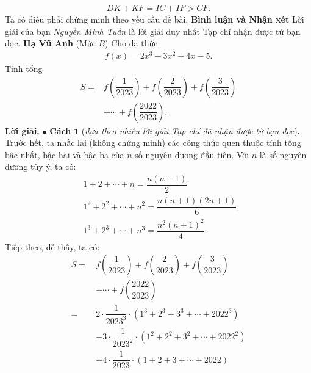 \begin{multicols}{2}
	\begin{align*}
		DK + KF = IC + IF > CF.
	\end{align*}
	Ta có điều phải chứng minh theo yêu cầu đề bài.
	\vskip 0.05cm
	\textbf{\color{thachthuctoanhoc}Bình luận và Nhận xét}
	\vskip 0.05cm
	Lời giải của bạn \textit{Nguyễn Minh Tuấn} là lời giải duy nhất Tạp chí nhận được từ bạn đọc.
	\vskip 0.1cm
	\hfill	\textbf{\color{thachthuctoanhoc}Hạ Vũ Anh}
	\vskip 0.1cm
	{}
	(Mức $B$) Cho đa thức
	\begin{align*}
		f\left( x \right) = 2{x^3} - 3{x^2} + 4x - 5.
	\end{align*}
	Tính tổng
	\begin{align*}
		S =& f\left( {\dfrac{1}{{2023}}} \right) + f\left( {\dfrac{2}{{2023}}} \right) + f\left( {\dfrac{3}{{2023}}} \right) \\
		&+  \cdots  + f\left( {\dfrac{{2022}}{{2023}}} \right).
	\end{align*}
	\textbf{\color{thachthuctoanhoc}Lời giải.}
	\vskip 0.05cm
	$\bullet$ \textbf{\color{thachthuctoanhoc}Cách} $\pmb{1}$ (\textit{dựa theo nhiều lời giải Tạp chí đã nhận được từ bạn đọc})\textbf{\color{thachthuctoanhoc}.}
	\vskip 0.05cm
	Trước hết, ta nhắc lại (không chứng minh) các công thức quen thuộc tính tổng bậc nhất, bậc hai và bậc ba của $n$ số nguyên dương đầu tiên.
	\vskip 0.05cm
	Với $n$ là số nguyên dương tùy ý, ta có:
	\begin{align*}
		&1 + 2 +  \cdots  + n = \dfrac{{n\left( {n + 1} \right)}}{2}\\
		&{1^2} + {2^2} +  \cdots  + {n^2} = \dfrac{{n\left( {n + 1} \right)\left( {2n + 1} \right)}}{6};\\
		&{1^3} + {2^3} +  \cdots  + {n^3} = \dfrac{{{n^2}{{\left( {n + 1} \right)}^2}}}{4}.
	\end{align*}
	Tiếp theo, dễ thấy, ta có:
	\begin{align*}
			S =\, &f\left( {\dfrac{1}{{2023}}} \right) + f\left( {\dfrac{2}{{2023}}} \right) + f\left( {\dfrac{3}{{2023}}} \right) \\
			&+  \cdots  + f\left( {\dfrac{{2022}}{{2023}}} \right)\\
			 =\,\, &2 \cdot \dfrac{1}{{{{2023}^3}}} \cdot \left( {{1^3} + {2^3} + {3^3} +  \cdots  + {{2022}^3}} \right) \\
			 &-\! 3 \!\cdot\! \dfrac{1}{{{{2023}^2}}} \!\cdot\! \left( {{1^2} \!+ {2^2} \!+ {3^2} \!+  \cdots  \!+ {{2022}^2}} \right)\\
			 &+ 4 \cdot \dfrac{1}{{2023}} \cdot \left( {1 + 2 + 3 +  \cdots  + 2022} \right) \\

\end{align*}
\end{multicols}
